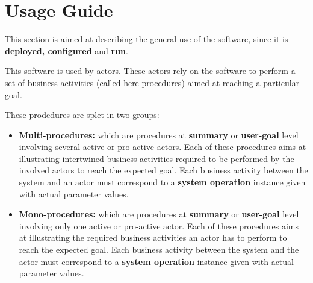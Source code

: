 \chapter{Usage Guide}
\label{chap:usage_guide}

This section is aimed at describing the general use of the software, since it is
\textbf{deployed, configured} and \textbf{run}.

This software is used by actors. These actors rely on the software to perform a
set of business activities (called here procedures) aimed at reaching a
particular goal. 

These prodedures are splet in two groups:
\begin{itemize}
  \item \textbf{Multi-procedures:} which are procedures at \textbf{summary} or
  \textbf{user-goal} level involving several active or pro-active actors.
  Each of these procedures aims at illustrating intertwined
  business activities required to be performed by the involved actors
  to reach the expected goal. Each business activity between the system and an
  actor must correspond to a \textbf{system operation} instance given with actual parameter values.

  \item \textbf{Mono-procedures:} which are procedures at \textbf{summary} or
  \textbf{user-goal} level involving only one active or pro-active actor.
  Each of these procedures aims at illustrating the required business
  activities an actor has to perform to reach the expected goal. Each business
  activity between the system and the actor must correspond to a \textbf{system
  operation} instance given with actual parameter values.

\end{itemize}

